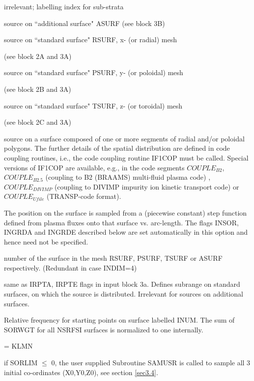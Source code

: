 \begin{list}{ }{}
\item[{\bf INUM }]
irrelevant; labelling index for sub-strata
\item[{\bf INDIM }]
\begin{list}{ }{}
\item[{= 0 }]
source on ``additional surface" ASURF (see block 3B)
\item[{= 1 }]
source on ``standard surface" RSURF, x- (or radial) mesh

(see block 2A and 3A) \item[{= 2 }] source on ``standard surface"
PSURF, y- (or poloidal) mesh

(see block 2B and 3A) \item[{= 3 }] source on ``standard surface"
TSURF, z- (or toroidal) mesh

(see block 2C and 3A)
\item[{= 4 }]
source on a surface composed of one or more segments of radial and/or
poloidal polygons. The further details of the spatial distribution
are defined in code coupling routines, i.e., the code coupling routine
IF1COP must be
called. Special versions of IF1COP are available, e.g., in the code
segments $COUPLE_{B2}$, $COUPLE_{B2.5}$
(coupling to B2 (BRAAMS) multi-fluid plasma code) , $COUPLE_{DIVIMP}$
(coupling
to DIVIMP impurity ion kinetic transport code) or  $COUPLE_{Ufile}$
(TRANSP-code format).

The position on the surface is sampled from a (piecewise constant) step function
defined from plasma fluxes
onto that surface
vs. arc-length.
The flags INSOR, INGRDA and INGRDE described below are set automatically
in this option and hence need not be specified.
\end{list}
\item[{\bf INSOR }]
number of the surface in the mesh RSURF, PSURF, TSURF or ASURF
respectively. (Redundant in case INDIM=4)
\item[{\bf INGRDA, INGRDE }]
same as IRPTA, IRPTE flags in input block 3a. Defines subrange
on standard surfaces, on which the source is distributed.
Irrelevant for sources on additional surfaces.
\item[{\bf SORWGT }]
Relative frequency for starting points
on surface labelled INUM. The sum  of SORWGT for all
NSRFSI surfaces is normalized to one internally.
\item[{\bf SORLIM }]
= KLMN

if SORLIM $\le$ 0, the user supplied
Subroutine SAMUSR
is called to sample all 3 initial
co-ordinates (X0,Y0,Z0), see section \ref{sec3.4}.


\end{list}
